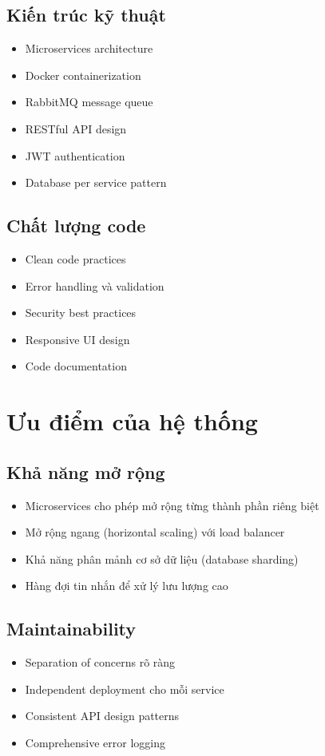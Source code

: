 \documentclass[12pt,a4paper]{report}
\begin{document}
\subsection{Kiến trúc kỹ thuật}
\begin{itemize}
    \item Microservices architecture
    \item Docker containerization
    \item RabbitMQ message queue
    \item RESTful API design
    \item JWT authentication
    \item Database per service pattern
\end{itemize}

\subsection{Chất lượng code}
\begin{itemize}
    \item Clean code practices
    \item Error handling và validation
    \item Security best practices
    \item Responsive UI design
    \item Code documentation
\end{itemize}

\section{Ưu điểm của hệ thống}

\subsection{Khả năng mở rộng}
\begin{itemize}
    \item Microservices cho phép mở rộng từng thành phần riêng biệt
    \item Mở rộng ngang (horizontal scaling) với load balancer
    \item Khả năng phân mảnh cơ sở dữ liệu (database sharding)
    \item Hàng đợi tin nhắn để xử lý lưu lượng cao
\end{itemize}

\subsection{Maintainability}
\begin{itemize}
    \item Separation of concerns rõ ràng
    \item Independent deployment cho mỗi service
    \item Consistent API design patterns
    \item Comprehensive error logging
\end{itemize}
\end{document}

